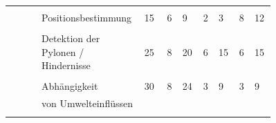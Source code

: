 \documentclass[main.tex]{subfiles} %
\begin{document}
\begin{landscape}
\begin{table}[ht]
\begin{tabular}{|p{0.11\linewidth}|p{0.18\linewidth}|p{0.085\linewidth}|p{0.057\linewidth}|p{0.07\linewidth}|p{0.057\linewidth}|p{0.07\linewidth}|p{0.057\linewidth}|p{0.07\linewidth}|}
            \cline{2-9}
                                                           &                                     &                                            &                                             &                                             &   &               &   &             \\[-9pt]
                                                           & Positionsbestimmung                 & 15                                         & 6                                           & 9                                           & 2 & 3             & 8 & 12          \\[1pt]
            \cline{2-9}
                                                           &                                     &                                            &                                             &                                             &   &               &   &             \\[-9pt]
                                                           & Detektion der Pylonen / Hindernisse & 25                                         & 8                                           & 20                                          & 6 & 15            & 6 & 15          \\[1pt]
            \cline{2-9}
                                                           &                                     &                                            &                                             &                                             &   &               &   &             \\[-9pt]
                                                           & Abhängigkeit                        & 30                                         & 8                                           & 24                                          & 3 & 9             & 3 & 9           \\[1pt]
                                                           & von Umwelteinflüssen                &                                            &                                             &                                             &   &               &   &             \\[1pt]
            \cline{2-9}
                                                           &                                     &                                            &                                             &                                             &   &               &   &             \\[-9pt]

\end{tabular}
\end{table}
\end{landscape}
\end{document}
